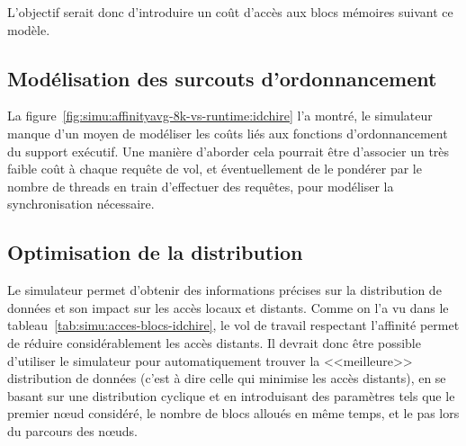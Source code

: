 L'objectif serait donc d'introduire un coût d'accès aux blocs mémoires suivant ce modèle.

\subsection{Modélisation des surcouts d'ordonnancement}

La figure~\ref{fig:simu:affinityavg-8k-vs-runtime:idchire} l'a montré, le simulateur manque d'un moyen de modéliser les coûts liés aux fonctions d'ordonnancement du support exécutif.
Une manière d'aborder cela pourrait être d'associer un très faible coût à chaque requête de vol, et éventuellement de le pondérer par le nombre de threads en train d'effectuer des requêtes, pour modéliser la synchronisation nécessaire.

\subsection{Optimisation de la distribution}

Le simulateur permet d'obtenir des informations précises sur la distribution de données et son impact sur les accès locaux et distants.
Comme on l'a vu dans le tableau~\ref{tab:simu:acces-blocs-idchire}, le vol de travail respectant l'affinité permet de réduire considérablement les accès distants.
Il devrait donc être possible d'utiliser le simulateur pour automatiquement trouver la <<meilleure>> distribution de données (c'est à dire celle qui minimise les accès distants), en se basant sur une distribution cyclique et en introduisant des paramètres tels que le premier nœud considéré, le nombre de blocs alloués en même temps, et le pas lors du parcours des nœuds.
